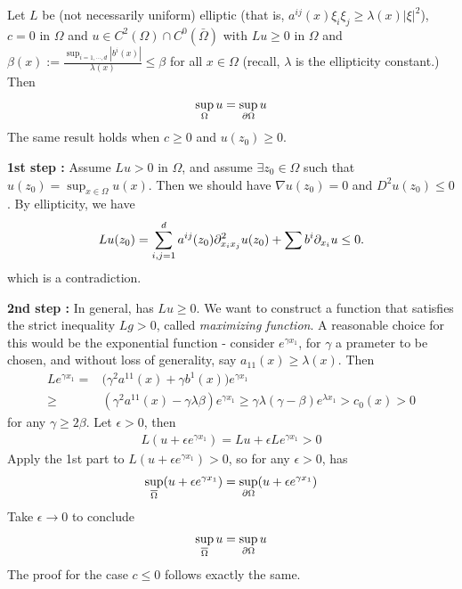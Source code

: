 \documentclass[12pt,a4paper]{article}
\newenvironment{proof}
{\begin{changemargin}{0.5cm}{0.5cm} 
	}%
	{\end{changemargin}
}
\newenvironment{p}
{\begin{proof} 
	}%
	{\end{proof}
}
\begin{document}
\thm Let $L$ be (not necessarily uniform) elliptic (that is, $a^{ij}(x) \xi_i \xi_j \geq \lambda(x) |\xi|^2$), $c=0$ in $\Omega$ and $u\in C^2(\Omega) \cap C^0(\bar{\Omega})$ with $Lu \geq 0$ in $\Omega$ and $\beta(x) := \frac{\sup_{i=1,\cdots,d} |b^i(x)|}{\lambda (x)} \leq\beta$ for all $x\in \Omega$ (recall, $\lambda$ is the ellipticity constant.) Then
\begin{align*}
\sup_{\Omega} u = \sup_{\partial \Omega} u
\end{align*}
The same result holds when $c\geq 0$ and $u(z_0) \geq 0$.
\begin{p}
\pf \textbf{1st step :} Assume $Lu >0$ in $\Omega$, and assume $\exists z_0 \in \Omega$ such that $u(z_0) = \sup_{x\in \Omega} u(x)$. Then we should have $\nabla u(z_0) =0$ and $D^2 u(z_0) \leq 0$. By ellipticity, we have 
\begin{align*}
Lu(z_0) = \sum_{i,j=1}^d a^{ij}(z_0) \partial^2_{x_i x_j} u(z_0) + \sum b^i \partial_{x_i} u \leq 0.
\end{align*}
which is a contradiction.
\s

\textbf{2nd step :} In general, has $Lu \geq 0$. We want to construct a function that satisfies the strict inequality $Lg > 0$, called \emph{maximizing function}. A reasonable choice for this would be the exponential function - consider $e^{\gamma x_1}$, for $\gamma$ a prameter to be chosen, and without loss of generality, say $a_{11}(x) \geq \lambda(x)$. Then
\begin{align*}
Le^{\gamma x_1} = & \big( \gamma^2 a^{11}(x) + \gamma b^1(x) \big) e^{\gamma x_1} \\
\geq & (\gamma^2 a^{11}(x) - \gamma \lambda \beta )e^{\gamma x_1} \geq \gamma \lambda (\gamma - \beta) e^{\lambda x_1} > c_0(x) > 0
\end{align*}
for any $\gamma \geq 2\beta$. Let $\epsilon >0$, then
\begin{align*}
L (u + \epsilon e^{\gamma x_1}) = Lu + \epsilon L e^{\gamma x_1} >0
\end{align*}
Apply the 1st part to $L(u + \epsilon e^{\gamma x_1}) >0$, so for any $\epsilon >0$, has
\begin{align*}
\sup_{\overline{\Omega}} (u + \epsilon e^{\gamma x_1}) = \sup_{\partial \Omega} (u + \epsilon e^{\gamma x_1})
\end{align*}
Take $\epsilon \rightarrow 0$ to conclude
\begin{align*}
\sup_{\overline{\Omega}} u = \sup_{\partial \Omega} u
\end{align*}
The proof for the case $c\leq 0$ follows exactly the same.
\eop
\end{p}
\s
\end{document}
